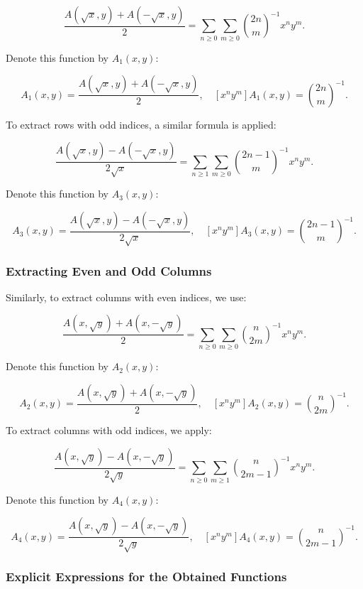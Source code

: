 \documentclass[12pt]{article}
\begin{document}
\[
\frac{A(\sqrt{x}, y) + A(-\sqrt{x}, y)}{2} = \sum_{n \geq 0} \sum_{m \geq 0} \binom{2n}{m}^{-1} x^n y^m.
\]

Denote this function by $A_1(x,y)$:

\begin{equation}\label{A1}
A_1(x,y) = \frac{A(\sqrt{x}, y) + A(-\sqrt{x}, y)}{2}, \quad
[x^n y^m] A_1(x,y) = \binom{2n}{m}^{-1}.
\end{equation}

To extract rows with odd indices, a similar formula is applied:

\[
\frac{A(\sqrt{x}, y) - A(-\sqrt{x}, y)}{2\sqrt{x}} = \sum_{n \geq 1} \sum_{m \geq 0} \binom{2n-1}{m}^{-1} x^n y^m.
\]

Denote this function by $A_3(x,y)$:

\begin{equation}\label{A3}
A_3(x,y) = \frac{A(\sqrt{x}, y) - A(-\sqrt{x}, y)}{2\sqrt{x}}, \quad
[x^n y^m] A_3(x,y) = \binom{2n-1}{m}^{-1}.
\end{equation}

\subsubsection{Extracting Even and Odd Columns}

Similarly, to extract columns with even indices, we use:

\[
\frac{A(x, \sqrt{y}) + A(x, -\sqrt{y})}{2} = \sum_{n \geq 0} \sum_{m \geq 0} \binom{n}{2m}^{-1} x^n y^m.
\]

Denote this function by $A_2(x,y)$:

\begin{equation}\label{A2}
A_2(x,y) = \frac{A(x, \sqrt{y}) + A(x, -\sqrt{y})}{2}, \quad
[x^n y^m] A_2(x,y) = \binom{n}{2m}^{-1}.
\end{equation}

To extract columns with odd indices, we apply:

\[
\frac{A(x, \sqrt{y}) - A(x, -\sqrt{y})}{2\sqrt{y}} = \sum_{n \geq 0} \sum_{m \geq 1} \binom{n}{2m-1}^{-1} x^n y^m.
\]

Denote this function by $A_4(x,y)$:

\begin{equation}\label{A4}
A_4(x,y) = \frac{A(x, \sqrt{y}) - A(x, -\sqrt{y})}{2\sqrt{y}}, \quad
[x^n y^m] A_4(x,y) = \binom{n}{2m-1}^{-1}.
\end{equation}

\subsubsection{Explicit Expressions for the Obtained Functions}
\end{document}

